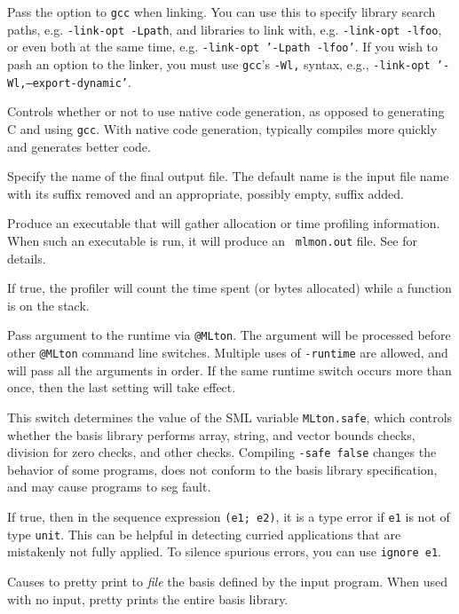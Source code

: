 \begin{description}
Pass the option to {\tt gcc} when linking.  You can use this to
specify library search paths, e.g. {\tt -link-opt -Lpath}, and
libraries to link with, e.g. {\tt -link-opt -lfoo}, or even both at
the same time, e.g. {\tt -link-opt '-Lpath -lfoo'}.  If you wish to
pash an option to the linker, you must use {\tt gcc}'s {\tt -Wl,}
syntax, e.g., {\tt -link-opt '-Wl,--export-dynamic'}.

Controls whether or not to use native code generation, as opposed to
generating C and using {\tt gcc}.  With native code generation,
{\mlton} typically compiles more quickly and generates better code.

Specify the name of the final output file. The default name is the
input file name with its suffix removed and an appropriate, possibly
empty, suffix added.

Produce an executable that will gather allocation or time profiling
information.  When such an executable is run, it will produce an {\tt
mlmon.out} file.  See  for details.

If true, the profiler will count the time spent (or bytes allocated)
while a function is on the stack.

Pass argument to the runtime via {\tt @MLton}.  The argument will be
processed before other {\tt @MLton} command line switches.  Multiple
uses of {\tt -runtime} are allowed, and will pass all the arguments in
order.  If the same runtime switch occurs more than once, then the
last setting will take effect.

This switch determines the value of the SML variable {\tt MLton.safe},
which controls whether the basis library performs array, string, and
vector bounds checks, division for zero checks, and other checks.
Compiling {\tt -safe false} changes the behavior of some programs,
does not conform to the basis library specification, and may cause
programs to seg fault.

If true, then in the sequence expression {\tt (e1; e2)}, it is a type
error if {\tt e1} is not of type {\tt unit}.  This can be helpful in
detecting curried applications that are mistakenly not fully applied.
To silence spurious errors, you can use {\tt ignore e1}.

Causes {\mlton} to pretty print to {\it file} the basis defined by the
input program.  When used with no input, {\mlton} pretty prints the
entire basis library.


\end{description}
